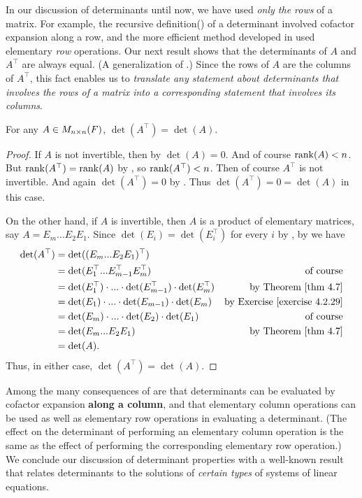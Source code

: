 In our discussion of determinants until now, we have used \emph{only the rows} of a matrix.
For example, the recursive definition() of a determinant involved cofactor expansion along a row,
and the more efficient method developed in  used elementary \emph{row} operations.
Our next result shows that the determinants of \(A\) and \(A^\top\) are always equal.
(A generalization of .)
Since the rows of \(A\) are the columns of \(A^\top\), this fact enables us to \emph{translate any statement about determinants that involves the rows of a matrix into a corresponding statement that involves its columns}.

\begin{theorem} \label{thm 4.8}
For any \(A \in M_{n \times n}(F)\), \(\det(A^\top) = \det(A)\).
\end{theorem}

\begin{proof}
If \(A\) is not invertible, then by  \(\det(A) = 0\).
And of course \(\mathrm{rank}(A) < n\).
But \(\mathrm{rank}(A^\top) = \mathrm{rank}(A)\) by , so \(\mathrm{rank}(A^\top) < n\).
Then of course \(A^\top\) is not invertible.
And again \(\det(A^\top) = 0\) by .
Thus \(\det(A^\top) = 0 = \det(A)\) in this case.

On the other hand, if \(A\) is invertible, then \(A\) is a product of elementary matrices, say \(A = E_m ... E_2E_1\).
Since \(\det(E_i) = \det(E_i^\top)\) for every \(i\) by
, by  we have
\begin{align*}
    \det(A^\top) & = \det((E_m ... E_2 E_1)^\top) \\
                 & = \det(E_1^\top ... E_{m-1}^\top E_m^\top) & \text{of course} \\
                 & = \det(E_1^\top) \cdot ... \cdot \det(E_{m-1}^\top) \cdot \det(E_m^\top) & \text{by \THM{4.7}} \\
                 & = \det(E_1) \cdot ... \cdot \det(E_{m-1}) \cdot \det(E_m) & \text{by \EXEC{4.2.29}} \\
                 & = \det(E_m) \cdot ... \cdot \det(E_2) \cdot \det(E_1) & \text{of course} \\
                 & = \det(E_m ... E_2 E_1) & \text{by \THM{4.7}} \\
                 & = \det(A).
\end{align*}
Thus, in either case, \(\det(A^\top) = \det(A)\).
\end{proof}

\begin{remark} \label{remark 4.3.2}
Among the many consequences of  are that determinants can be evaluated by cofactor expansion \textbf{along a column},
and that elementary column operations can be used as well as elementary row operations in evaluating a determinant.
(The effect on the determinant of performing an elementary column operation is the same as the effect of performing the corresponding elementary row operation.)
We conclude our discussion of determinant properties with a well-known result that relates determinants to the solutions of \emph{certain types} of systems of linear equations.
\end{remark}

